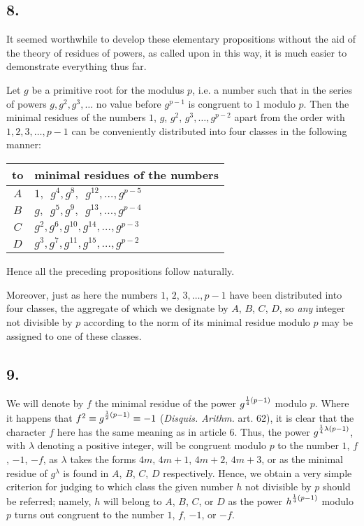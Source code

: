 \documentclass[twoside,12pt, showframe]{memoir}
\let\oldfrac\frac
\def\frac#1#2{\mathchoice{\tfrac{#1}{#2}}{\oldfrac{#1}{#2}}{\genfrac{}{}{}{2}{#1}{#2\mathstrut}}{\genfrac{}{}{}{3}{#1}{#2\mathstrut}}}
\begin{document}
\subsection*{8.}

It seemed worthwhile to develop these elementary propositions without the aid of the theory of residues of powers, as called upon in this way, it is much easier to demonstrate everything thus far.

Let \(g\) be a primitive root for the modulus \(p\), i.e. a number such that in the series of powers \(g, g^2, g^3, \ldots\) no value before \(g^{p-1}\) is congruent to 1 modulo \(p\). Then the minimal residues of the numbers \(1\), \(g\), \(g^2\), \(g^3, \ldots, g^{p-2}\) apart from the order with \(1, 2, 3, \ldots, p-1\) can be conveniently distributed into four classes in the following manner:\clearpage\noindent%
\begin{center}
\begin{tabular}{c|l}
to & minimal residues of the numbers \\
\hline
\(A\) & \(1, \phantom{g}g^4, g^8, \phantom{g}g^{12}, \ldots, g^{p-5}\) \\
\(B\) & \(g, \phantom{g}g^5, g^9, \phantom{g}g^{13}, \ldots, g^{p-4}\) \\
\(C\) & \(g^2, g^6, g^{10}, g^{14}, \ldots, g^{p-3}\) \\
\(D\) & \(g^3, g^7, g^{11}, g^{15}, \ldots, g^{p-2}\) \\
\end{tabular}
\end{center}

Hence all the preceding propositions follow naturally.

Moreover, just as here the numbers \(1\), \(2\), \(3, \ldots, p-1\) have been distributed into four classes, the aggregate of which we designate by \(A\), \(B\), \(C\), \(D\), so \textit{any} integer not divisible by \(p\) according to the norm of its minimal residue modulo \(p\) may be assigned to one of these classes.
%

\subsection*{9.}

We will denote by \(f\) the minimal residue of the power \(g^{\frac{1}{4}(p-1)}\) modulo \(p\).  Where it happens that \(f^2 \equiv g^{\frac{1}{2}(p-1)} \equiv -1\) (\textit{Disquis. Arithm.} art. 62), it is clear that the character \(f\) here has the same meaning as in article 6.  Thus, the power \(g^{\frac{1}{4} \lambda(p-1)}\), with \(\lambda\) denoting a positive integer, will be congruent modulo \(p\) to the number \(1\), \(f\), \(-1\), \(-f\), as \(\lambda\) takes the forms \(4m\), \(4m+1\), \(4m+2\), \(4m+3\), or as the minimal residue of \(g^{\lambda}\) is found in \(A\), \(B\), \(C\), \(D\) respectively.  Hence, we obtain a very simple criterion for judging to which class the given number \(h\) not divisible by \(p\) should be referred; namely, \(h\) will belong to \(A\), \(B\), \(C\), or \(D\) as the power \(h^{\frac{1}{4}(p-1)}\) modulo \(p\) turns out congruent to the number \(1\), \(f\), \(-1\), or \(-f\).
\end{document}
